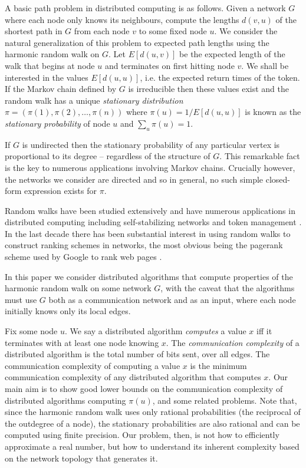 \documentclass[twocolumn]{article}
\begin{document}
A basic path problem in distributed computing is as follows. Given a network $G$ where each node only knows its neighbours, compute the lengths $d(v,u)$ of the shortest path in $G$ from each node $v$ to some fixed node $u$. We consider the natural generalization of this problem to expected path lengths using the harmonic random walk on $G$. Let $E[d(u,v)]$ be the expected length of the walk that begins at node $u$ and terminates on first hitting node $v$. We shall be interested in the values $E[d(u,u)]$, i.e. the expected return times of the token. If the Markov chain defined by $G$ is irreducible then these values exist and the random walk has a unique {\em stationary distribution} $\pi=(\pi(1),\pi(2),\ldots,\pi(n))$ where $\pi(u) = 1 / E[d(u,u)]$ is known as the {\em stationary probability} of node $u$ and $\sum_u \pi(u) = 1$.

If $G$ is undirected then the stationary probability of any particular vertex is proportional to its degree -- regardless of the structure of $G$. This remarkable fact is the key to numerous applications involving Markov chains. Crucially however, the networks we consider are directed and so in general, no such simple closed-form expression exists for $\pi$.

Random walks have been studied extensively and have numerous applications in distributed computing including self-stabilizing networks and token management \cite{coppersmith93}. In the last decade there has been substantial interest in using random walks to construct ranking schemes in networks, the most obvious being the pagerank scheme used by Google to rank web pages \cite{page98pagerank}.

In this paper we consider distributed algorithms that compute properties of the harmonic random walk on some network $G$, with the caveat that the algorithms must use $G$ both as a communication network and as an input, where each node initially knows only its local edges.

Fix some node $u$. We say a distributed algorithm {\em computes} a value $x$ iff it
terminates with at least one node knowing $x$. The {\em communication
complexity} of a distributed algorithm is the total number of bits sent,
over all edges. The communication complexity of computing a value $x$ is
the minimum communication complexity of any distributed algorithm that
computes $x$. Our main aim is to show good lower bounds on the communication complexity of distributed algorithms computing $\pi(u)$, and some related problems.
Note that, since the harmonic random walk uses only rational probabilities (the reciprocal of the outdegree of a node), the stationary probabilities are also rational and can be computed using finite precision. Our problem, then, is not how to efficiently approximate a real number, but how to understand its inherent complexity based on the network topology that generates it.
\end{document}
